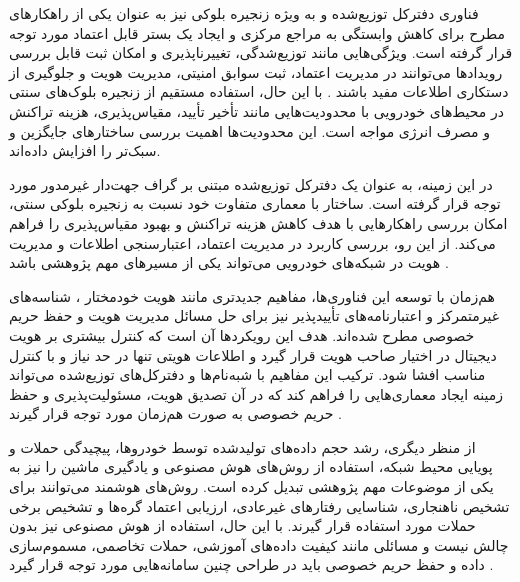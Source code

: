 \documentclass[12pt,a4paper]{article}
\begin{document}
فناوری دفترکل توزیع‌شده و به ویژه زنجیره بلوکی نیز به عنوان یکی از راهکارهای مطرح برای کاهش وابستگی به مراجع مرکزی و ایجاد یک بستر قابل اعتماد مورد توجه قرار گرفته است. ویژگی‌هایی مانند توزیع‌شدگی، تغییرناپذیری و امکان ثبت قابل بررسی رویدادها می‌توانند در مدیریت اعتماد، ثبت سوابق امنیتی، مدیریت هویت و جلوگیری از دستکاری اطلاعات مفید باشند \cite{razaBlockchainBasedReputationTrust2024,fengBPASBlockchainAssistedPrivacyPreserving2020}. با این حال، استفاده مستقیم از زنجیره بلوک‌های سنتی در محیط‌های خودرویی با محدودیت‌هایی مانند تأخیر تأیید، مقیاس‌پذیری، هزینه تراکنش و مصرف انرژی مواجه است. این محدودیت‌ها اهمیت بررسی ساختارهای جایگزین و سبک‌تر را افزایش داده‌اند.

در این زمینه،  به عنوان یک دفترکل توزیع‌شده مبتنی بر گراف جهت‌دار غیرمدور  مورد توجه قرار گرفته است. ساختار  با معماری متفاوت خود نسبت به زنجیره بلوکی سنتی، امکان بررسی راهکارهایی با هدف کاهش هزینه تراکنش و بهبود مقیاس‌پذیری را فراهم می‌کند. از این رو، بررسی کاربرد  در مدیریت اعتماد، اعتبارسنجی اطلاعات و مدیریت هویت در شبکه‌های خودرویی می‌تواند یکی از مسیرهای مهم پژوهشی باشد \cite{IOTATANGLE20,silvanoIotaTangleCryptocurrency2020,feraudoDIVADIDbasedReputation2024}.

هم‌زمان با توسعه این فناوری‌ها، مفاهیم جدیدتری مانند هویت خودمختار ، شناسه‌های غیرمتمرکز  و اعتبارنامه‌های تأییدپذیر  نیز برای حل مسائل مدیریت هویت و حفظ حریم خصوصی مطرح شده‌اند. هدف این رویکردها آن است که کنترل بیشتری بر هویت دیجیتال در اختیار صاحب هویت قرار گیرد و اطلاعات هویتی تنها در حد نیاز و با کنترل مناسب افشا شود. ترکیب این مفاهیم با شبه‌نام‌ها و دفترکل‌های توزیع‌شده می‌تواند زمینه ایجاد معماری‌هایی را فراهم کند که در آن تصدیق هویت، مسئولیت‌پذیری و حفظ حریم خصوصی به صورت هم‌زمان مورد توجه قرار گیرند \cite{mazzocca2025survey,feraudoDIVADIDbasedReputation2024}.

از منظر دیگری، رشد حجم داده‌های تولیدشده توسط خودروها، پیچیدگی حملات و پویایی محیط شبکه، استفاده از روش‌های هوش مصنوعی و یادگیری ماشین را نیز به یکی از موضوعات مهم پژوهشی تبدیل کرده است. روش‌های هوشمند می‌توانند برای تشخیص ناهنجاری، شناسایی رفتارهای غیرعادی، ارزیابی اعتماد گره‌ها و تشخیص برخی حملات مورد استفاده قرار گیرند. با این حال، استفاده از هوش مصنوعی نیز بدون چالش نیست و مسائلی مانند کیفیت داده‌های آموزشی، حملات تخاصمی، مسموم‌سازی داده و حفظ حریم خصوصی باید در طراحی چنین سامانه‌هایی مورد توجه قرار گیرد \cite{farsimadanReviewSecurityChallenges2025}.
\end{document}
